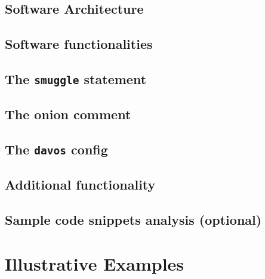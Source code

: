 \documentclass[preprint,12pt, a4paper]{elsarticle}
\begin{document}
\subsection{Software Architecture}


\subsection{Software functionalities}\label{sec:functionalities}

\subsection{The \texttt{smuggle} statement}

\subsection{The onion comment}

\subsection{The \texttt{davos} config}

\subsection{Additional functionality}



\subsection{Sample code snippets analysis (optional)}


\section{Illustrative Examples}

\end{document}
